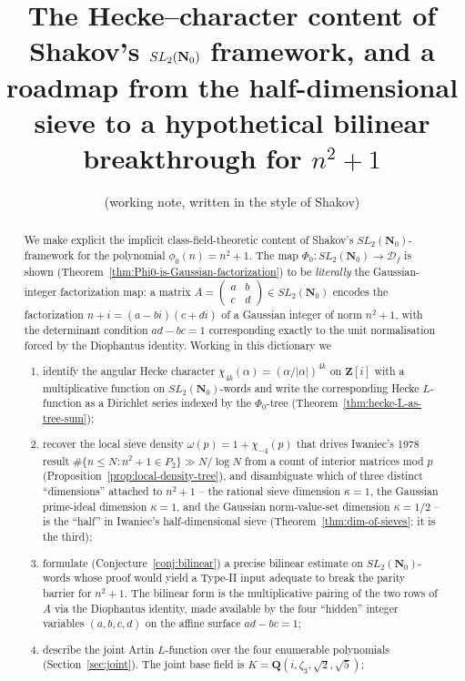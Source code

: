 \documentclass[11pt]{article}
\title{The Hecke--character content of Shakov's $\SLNz$ framework, and a roadmap from the half-dimensional sieve to a hypothetical bilinear breakthrough for $n^2+1$}
\author{(working note, written in the style of Shakov)}
\date{}
\theoremstyle{definition}
\newcommand{\Nz}{\mathbf{N}_0}
\newcommand{\Z}{\mathbf{Z}}
\newcommand{\Q}{\mathbf{Q}}
\newcommand{\Df}{\mathcal{D}_f}
\newcommand{\SLNz}{SL_2(\Nz)}
\begin{document}
\maketitle

\begin{abstract}
We make explicit the implicit class-field-theoretic content of Shakov's $\SLNz$-framework
for the polynomial $\phi_0(n) = n^2 + 1$.
The map $\Phi_0 \colon \SLNz \to \Df$ is shown (Theorem~\ref{thm:Phi0-is-Gaussian-factorization})
to be \emph{literally} the Gaussian-integer factorization map: a matrix
$A = \left(\begin{smallmatrix} a & b \\ c & d \end{smallmatrix}\right) \in \SLNz$ encodes the
factorization $n+i = (a-bi)(c+di)$ of a Gaussian integer of norm $n^2+1$, with the
determinant condition $ad-bc=1$ corresponding exactly to the unit normalisation forced by
the Diophantus identity. Working in this dictionary we
\begin{enumerate}
\item identify the angular Hecke character $\chi_{4k}(\alpha) = (\alpha/|\alpha|)^{4k}$ on
$\Z[i]$ with a multiplicative function on $\SLNz$-words and write the corresponding
Hecke $L$-function as a Dirichlet series indexed by the $\Phi_0$-tree
(Theorem~\ref{thm:hecke-L-as-tree-sum});
\item recover the local sieve density $\omega(p) = 1 + \chi_{-4}(p)$ that drives Iwaniec's
1978 result $\#\{n\le N: n^2+1 \in P_2\} \gg N/\log N$ from a count of interior matrices
mod $p$ (Proposition~\ref{prop:local-density-tree}), and disambiguate which of three
distinct ``dimensions'' attached to $n^2+1$ -- the rational sieve dimension
$\kappa = 1$, the Gaussian prime-ideal dimension $\kappa = 1$, and the Gaussian
norm-value-set dimension $\kappa = 1/2$ -- is the ``half'' in Iwaniec's
half-dimensional sieve (Theorem~\ref{thm:dim-of-sieves}: it is the third);
\item formulate (Conjecture~\ref{conj:bilinear}) a precise bilinear estimate on
$\SLNz$-words whose proof would yield a Type-II input adequate to break the parity barrier
for $n^2+1$. The bilinear form is the multiplicative pairing of the two rows of $A$ via
the Diophantus identity, made available by the four ``hidden'' integer variables
$(a,b,c,d)$ on the affine surface $ad-bc=1$;
\item describe the joint Artin $L$-function over the four enumerable polynomials
(Section~\ref{sec:joint}). The joint base field is $K = \Q(i,\zeta_3,\sqrt 2,\sqrt 5)$;

\end{enumerate}
\end{abstract}
\end{document}
